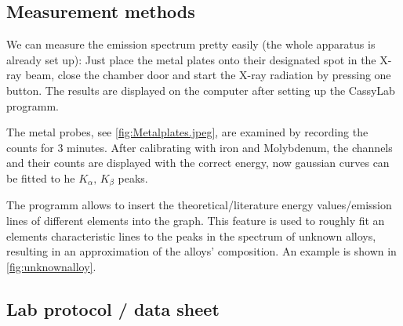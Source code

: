 \subsection{Measurement methods}
We can measure the emission spectrum pretty easily (the whole apparatus is already set up): Just place the metal plates onto their designated spot in the X-ray beam, close the chamber door and start the X-ray radiation by pressing one button. The results are displayed on the computer after setting up the CassyLab programm.  

The metal probes, see \cref{fig:Metalplates.jpeg}, are examined by recording the counts for 3 minutes. After calibrating with iron and Molybdenum, the channels and their counts are displayed with the correct energy, now gaussian curves can be fitted to he \(K_\alpha,\,K_\beta\) peaks. 

The programm allows to insert the theoretical/literature energy values/emission lines of different elements into the graph. This feature is used to roughly fit an elements characteristic lines to the peaks in the spectrum of unknown alloys, resulting in an approximation of the alloys' composition. An example is shown in \cref{fig:unknownalloy}.
\vfill
\subsection{Lab protocol / data sheet}

